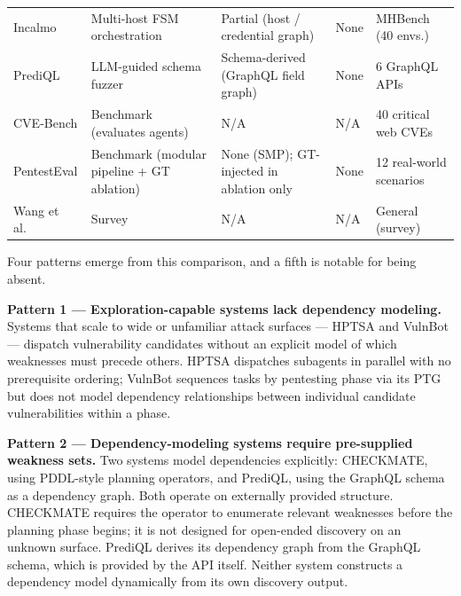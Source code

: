 \begin{table}[h!]
\begin{tabular}{p{2.7cm}p{2.8cm}p{2.8cm}p{1.8cm}p{2.4cm}}
		Incalmo \citep{singer2025incalmo}         & Multi-host FSM orchestration                     & Partial (host / credential graph)            & None                          & MHBench (40 envs.)      \\
		PrediQL \citep{liu2025prediql}            & LLM-guided schema fuzzer                         & Schema-derived (GraphQL field graph)         & None                          & 6 GraphQL APIs          \\
		CVE-Bench \citep{zhu2025cvebench}         & Benchmark (evaluates agents)                     & N/A                                          & N/A                           & 40 critical web CVEs    \\
		PentestEval \citep{yang2025pentesteval}   & Benchmark (modular pipeline + GT ablation)       & None (SMP); GT-injected in ablation only     & None                          & 12 real-world scenarios \\
		Wang et al.\ \citep{wang2025surveyagents} & Survey                                           & N/A                                          & N/A                           & General (survey)        \\
		\bottomrule
	\end{tabular}
\end{table}

Four patterns emerge from this comparison, and a fifth is notable for being absent.

\textbf{Pattern 1 --- Exploration-capable systems lack dependency modeling.} Systems that scale to wide or unfamiliar attack surfaces --- HPTSA and VulnBot --- dispatch vulnerability candidates without an explicit model of which weaknesses must precede others. HPTSA dispatches subagents in parallel with no prerequisite ordering; VulnBot sequences tasks by pentesting phase via its PTG but does not model dependency relationships between individual candidate vulnerabilities within a phase.

\textbf{Pattern 2 --- Dependency-modeling systems require pre-supplied weakness sets.} Two systems model dependencies explicitly: CHECKMATE, using PDDL-style planning operators, and PrediQL, using the GraphQL schema as a dependency graph. Both operate on externally provided structure. CHECKMATE requires the operator to enumerate relevant weaknesses before the planning phase begins; it is not designed for open-ended discovery on an unknown surface. PrediQL derives its dependency graph from the GraphQL schema, which is provided by the API itself. Neither system constructs a dependency model dynamically from its own discovery output.

